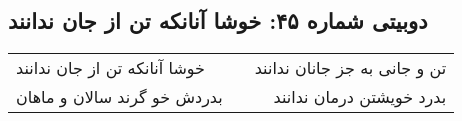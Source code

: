 \begin{center}
\section*{دوبیتی شماره ۴۵: خوشا آنانکه تن از جان ندانند}
\label{sec:045}
\begin{longtable}{l p{0.5cm} r}
خوشا آنانکه تن از جان ندانند
&&
تن و جانی به جز جانان ندانند
\\
بدردش خو گرند سالان و ماهان
&&
بدرد خویشتن درمان ندانند
\\
\end{longtable}
\end{center}
